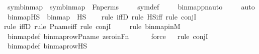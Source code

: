 \begin{isabellebody}
{\isafoldproof}%
%
\isadelimproof
\isanewline
%
\endisadelimproof
\isanewline
{}\isamarkupfalse%
\ sym{\isacharunderscore}{\kern0pt}binmap{\isacharprime}{\kern0pt}\ {\isacharcolon}{\kern0pt}\ {\isachardoublequoteopen}sym{\isacharparenleft}{\kern0pt}binmap{\isacharprime}{\kern0pt}{\isacharparenright}{\kern0pt}\ {\isacharequal}{\kern0pt}\ Fn{\isacharunderscore}{\kern0pt}perms{\isachardoublequoteclose}\ \isanewline
%
\isadelimproof
\ \ %
\endisadelimproof
%
\isatagproof
{}\isamarkupfalse%
\ sym{\isacharunderscore}{\kern0pt}def\ \isanewline
\ \ \isamarkupfalse%
\ binmap{\isacharprime}{\kern0pt}{\isacharunderscore}{\kern0pt}pnauto\ \isanewline
\ \ \isamarkupfalse%
\ auto%
\endisatagproof
{\isafoldproof}%
%
\isadelimproof
\isanewline
%
\endisadelimproof
\isanewline
{}\isamarkupfalse%
\ binmap{\isacharprime}{\kern0pt}{\isacharunderscore}{\kern0pt}HS\ {\isacharcolon}{\kern0pt}\ {\isachardoublequoteopen}binmap{\isacharprime}{\kern0pt}\ {\isasymin}\ HS{\isachardoublequoteclose}\ \isanewline
%
\isadelimproof
\ \ %
\endisadelimproof
%
\isatagproof
{}\isamarkupfalse%
{\isacharparenleft}{\kern0pt}rule\ iffD{}{\isacharcomma}{\kern0pt}\ rule\ HS{\isacharunderscore}{\kern0pt}iff{\isacharcomma}{\kern0pt}\ rule\ conjI{\isacharparenright}{\kern0pt}\isanewline
\ \ \ \isamarkupfalse%
{\isacharparenleft}{\kern0pt}rule\ iffD{}{\isacharcomma}{\kern0pt}\ rule\ P{\isacharunderscore}{\kern0pt}name{\isacharunderscore}{\kern0pt}iff{\isacharcomma}{\kern0pt}\ rule\ conjI{\isacharparenright}{\kern0pt}\isanewline
\ \ \ \ \isamarkupfalse%
{\isacharparenleft}{\kern0pt}rule\ binmap{\isacharprime}{\kern0pt}{\isacharunderscore}{\kern0pt}in{\isacharunderscore}{\kern0pt}M{\isacharparenright}{\kern0pt}\isanewline
\ \ \isamarkupfalse%
\ binmap{\isacharprime}{\kern0pt}{\isacharunderscore}{\kern0pt}def\ binmap{\isacharunderscore}{\kern0pt}row{\isacharprime}{\kern0pt}{\isacharunderscore}{\kern0pt}P{\isacharunderscore}{\kern0pt}name\ zero{\isacharunderscore}{\kern0pt}in{\isacharunderscore}{\kern0pt}Fn\ \isanewline
\ \ \ \isamarkupfalse%
\ force\isanewline
\ \ \isamarkupfalse%
{\isacharparenleft}{\kern0pt}rule\ conjI{\isacharparenright}{\kern0pt}\isanewline
\ \ \isamarkupfalse%
\ binmap{\isacharprime}{\kern0pt}{\isacharunderscore}{\kern0pt}def\ binmap{\isacharunderscore}{\kern0pt}row{\isacharprime}{\kern0pt}{\isacharunderscore}{\kern0pt}HS\ \isanewline
\ \ \ \isamarkupfalse%

\end{isabellebody}
